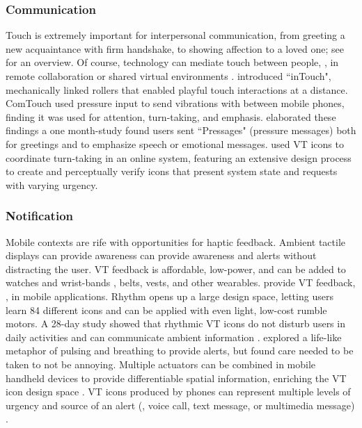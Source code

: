 \subsubsection{ Communication}
Touch is extremely important for interpersonal communication, from greeting a new acquaintance with firm handshake, to showing affection to a loved one; see \citet{Gallace2010} for an overview.
Of course, technology can mediate touch between people, \eg, in remote collaboration or shared virtual environments \cite{Haans2006}.
\citet{Brave1997} introduced ``inTouch", mechanically linked rollers that enabled playful touch interactions at a distance.
ComTouch \cite{Chang2002a} used pressure input to send vibrations with between mobile phones, finding it was used for attention, turn-taking, and emphasis.
\citet{Hoggan2012} elaborated these findings a one month-study found users sent ``Pressages" (pressure messages) both for greetings and to emphasize speech or emotional messages.
\citet{Chan2008} used VT icons to coordinate turn-taking in an online system, featuring an extensive design process to create and perceptually verify icons that present system state and requests with varying urgency.




\subsubsection{Notification}
Mobile contexts are rife with opportunities for haptic feedback.
Ambient tactile displays can provide awareness can provide awareness and alerts without distracting the user.
VT feedback is affordable, low-power, and can be added to watches and wrist-bands \cite{Brunet2013a,Arab2015}, belts, vests, and other wearables.
 provide VT feedback, \eg, in mobile applications.
Rhythm opens up a large design space, letting users learn 84 different icons \cite{Ternes2008} and can be applied with even light, low-cost rumble motors.
A 28-day study showed that rhythmic VT icons do not disturb users in daily activities and can communicate ambient information \cite{Cauchard2016}.
\citet{Hemmert2008} explored a life-like metaphor of pulsing and breathing to provide alerts, but found care needed to be taken to not be annoying.
Multiple actuators can be combined in mobile handheld devices to provide differentiable spatial information, enriching the VT icon design space \cite{Yatani2009a}.
VT icons produced by phones can represent multiple levels of urgency and source of an alert (\eg, voice call, text message, or multimedia message) \cite{Brown2006mobilealerts}.


